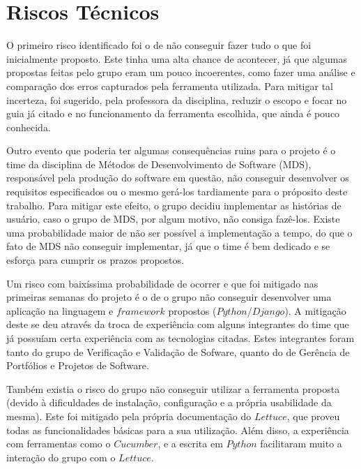 \chapter[Riscos Técnicos]{Riscos Técnicos}

O primeiro risco identificado foi o de não conseguir fazer tudo o que foi inicialmente proposto. Este tinha uma alta chance de acontecer, já que algumas propostas feitas pelo grupo eram um pouco incoerentes, como fazer uma análise e comparação dos erros capturados pela ferramenta utilizada. Para mitigar tal incerteza, foi sugerido, pela professora da disciplina, reduzir o escopo e focar no guia já citado e no funcionamento da ferramenta escolhida, que ainda é pouco conhecida.

Outro evento que poderia ter algumas consequências ruins para o projeto é o time da disciplina de Métodos de Desenvolvimento de Software (MDS), responsável pela produção do software em questão, não conseguir desenvolver os requisitos especificados ou o mesmo gerá-los tardiamente para o próposito deste trabalho. Para mitigar este efeito, o grupo decidiu implementar as histórias de usuário, caso o grupo de MDS, por algum motivo, não consiga fazê-los. Existe uma probabilidade maior de não ser possível a implementação a tempo, do que o fato de MDS não conseguir implementar, já que o time é bem dedicado e se esforça para cumprir os prazos propostos.

Um risco com baixíssima probabilidade de ocorrer e que foi mitigado nas primeiras semanas do projeto é o de o grupo não conseguir desenvolver uma aplicação na linguagem e $framework$ propostos ($Python$/$Django$). A mitigação deste se deu através da troca de experiência com alguns integrantes do time que já possuíam certa experiência com as tecnologias citadas. Estes integrantes foram tanto do grupo de Verificação e Validação de Sofware, quanto do de Gerência de Portfólios e Projetos de Software.

Também existia o risco do grupo não conseguir utilizar a ferramenta proposta (devido à dificuldades de instalação, configuração e a própria usabilidade da mesma). Este foi mitigado pela própria documentação do $Lettuce$, que proveu todas as funcionalidades básicas para a sua utilização. Além disso, a experiência com ferramentas como o $Cucumber$, e a escrita em $Python$ facilitaram muito a interação do grupo com o $Lettuce$.